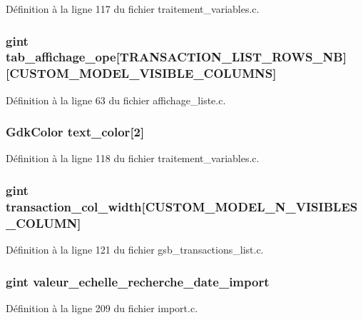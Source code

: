 Définition à la ligne 117 du fichier traitement\_\-variables.c.

\subsubsection[{tab\_\-affichage\_\-ope}]{\setlength{\rightskip}{0pt plus 5cm}gint {\bf tab\_\-affichage\_\-ope}[TRANSACTION\_\-LIST\_\-ROWS\_\-NB][CUSTOM\_\-MODEL\_\-VISIBLE\_\-COLUMNS]}\label{gsb__file__save_8c_a0c444565adac369ff42631d4b7b7e6bb}


Définition à la ligne 63 du fichier affichage\_\-liste.c.

\subsubsection[{text\_\-color}]{\setlength{\rightskip}{0pt plus 5cm}GdkColor {\bf text\_\-color}[2]}\label{gsb__file__save_8c_a8169600c05eb3674c1b11ca67dd677d3}


Définition à la ligne 118 du fichier traitement\_\-variables.c.

\subsubsection[{transaction\_\-col\_\-width}]{\setlength{\rightskip}{0pt plus 5cm}gint {\bf transaction\_\-col\_\-width}[CUSTOM\_\-MODEL\_\-N\_\-VISIBLES\_\-COLUMN]}\label{gsb__file__save_8c_a6e5e85a5f63608656ce9709950bb08e6}


Définition à la ligne 121 du fichier gsb\_\-transactions\_\-list.c.

\subsubsection[{valeur\_\-echelle\_\-recherche\_\-date\_\-import}]{\setlength{\rightskip}{0pt plus 5cm}gint {\bf valeur\_\-echelle\_\-recherche\_\-date\_\-import}}\label{gsb__file__save_8c_abd82865835fd6c5fcfe97283dbfd0648}


Définition à la ligne 209 du fichier import.c.

